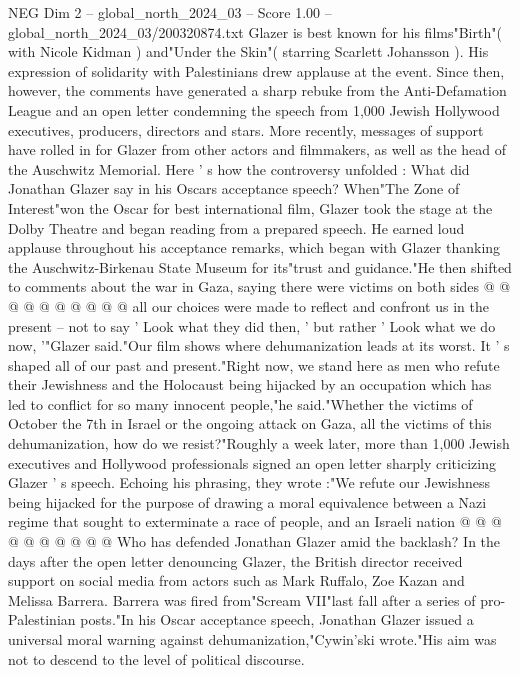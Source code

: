 \begin{textsample}{NEG Dim 2 – global\_north\_2024\_03 – Score 1.00 – global\_north\_2024\_03/200320874.txt}  \label{ex:f2_neg_348}
Glazer is best known for his films"Birth"( with Nicole Kidman ) and"Under the Skin"( starring Scarlett Johansson ).
His expression of solidarity with Palestinians drew applause at the event.
Since then, however, the comments have generated a sharp rebuke from the Anti-Defamation League and an open letter condemning the speech from 1,000 Jewish Hollywood executives, producers, directors and stars.
More recently, messages of support have rolled in for Glazer from other actors and filmmakers, as well as the head of the Auschwitz Memorial.
Here ' s how the controversy unfolded : What did Jonathan Glazer say in his Oscars acceptance speech?
When"The Zone of Interest"won the Oscar for best international film, Glazer took the stage at the Dolby Theatre and began reading from a prepared speech.
He earned loud applause throughout his acceptance remarks, which began with Glazer thanking the Auschwitz-Birkenau State Museum for its"trust and guidance."He then shifted to comments about the war in Gaza, saying there were victims on both sides @ @ @ @ @ @ @ @ @ @ all our choices were made to reflect and confront us in the present -- not to say ' Look what they did then, ' but rather ' Look what we do now, '"Glazer said."Our film shows where dehumanization leads at its worst.
It ' s shaped all of our past and present."Right now, we stand here as men who refute their Jewishness and the Holocaust being hijacked by an occupation which has led to conflict for so many innocent people,"he said."Whether the victims of October the 7th in Israel or the ongoing attack on Gaza, all the victims of this dehumanization, how do we resist?"Roughly a week later, more than 1,000 Jewish executives and Hollywood professionals signed an open letter sharply criticizing Glazer ' s speech.
Echoing his phrasing, they wrote :"We refute our Jewishness being hijacked for the purpose of drawing a moral equivalence between a Nazi regime that sought to exterminate a race of people, and an Israeli nation @ @ @ @ @ @ @ @ @ @ Who has defended Jonathan Glazer amid the backlash?
In the days after the open letter denouncing Glazer, the British director received support on social media from actors such as Mark Ruffalo, Zoe Kazan and Melissa Barrera.
Barrera was fired from"Scream VII"last fall after a series of pro-Palestinian posts."In his Oscar acceptance speech, Jonathan Glazer issued a universal moral warning against dehumanization,"Cywin'ski wrote."His aim was not to descend to the level of political discourse.

\end{textsample}

